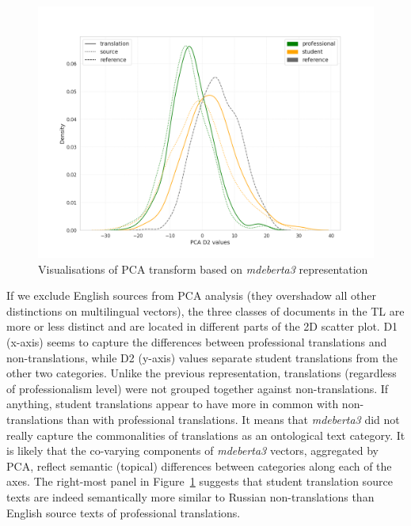 \begin{figure}[H]
\begin{minipage}[c]{0.31\linewidth}
		\includegraphics[width=\linewidth]{figures/pca/src-var-ttype-mdeberta3-base-PCA-D2-lines}
	\end{minipage}
	\caption{\label{fig:vars-deberta}Visualisations of PCA transform based on \textit{mdeberta3} representation}	
\end{figure}

If we exclude English sources from PCA analysis (they overshadow all other distinctions on multilingual vectors), the three classes of documents in the TL are more or less distinct and are located in different parts of the 2D scatter plot. D1 (x-axis) seems to capture the differences between professional translations and non-translations, while D2 (y-axis) values separate student translations from the other two categories. Unlike the previous representation, translations (regardless of professionalism level) were not grouped together against non-translations. If anything, student translations appear to have more in common with non-translations than with professional translations. It means that \textit{mdeberta3} did not really capture the commonalities of translations as an ontological text category. It is likely that the co-varying components of \textit{mdeberta3} vectors, aggregated by PCA, reflect semantic (topical) differences between categories along each of the axes. The right-most panel in Figure~\ref{fig:vars-deberta} suggests that student translation source texts are indeed semantically more similar to Russian non-translations than English source texts of professional translations. 

